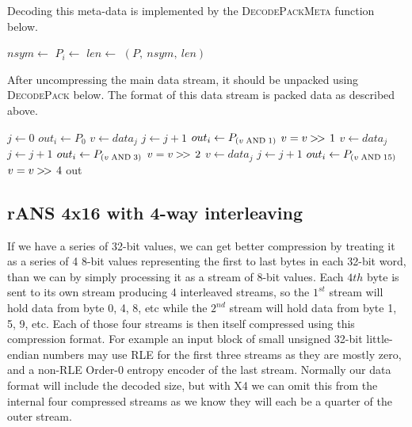 \documentclass[a4paper]{article}
\begin{document}
Decoding this meta-data is implemented by the \textsc{DecodePackMeta}
function below.

\begin{algorithmic}[1]
  \State $nsym \gets $
    \State $P_i \gets $ 
  \EndFor
  \State $len \gets $ 
  \State \Return $(P,\ nsym, \ len)$
\EndFunction
\end{algorithmic}

After uncompressing the main data stream, it should be unpacked using
\textsc{DecodePack} below.  The format of this data stream is packed
data as described above.

\begin{algorithmic}[1]
  \State $j \gets 0$ 
   
      \State $out_i \gets P_0$
    \EndFor
  \Statex
   
        \State $v \gets data_j$
        \State $j \gets j+1$
      \EndIf
      \State $out_i \gets P_{(v \bitand 1)}$
      \State $v = v \mathbin{>\mkern-3mu>\,} 1$
    \EndFor
  \Statex
   
        \State $v \gets data_j$
        \State $j \gets j+1$
      \EndIf
      \State $out_i \gets P_{(v \bitand 3)}$
      \State $v = v \mathbin{>\mkern-3mu>\,} 2$
    \EndFor
  \Statex
   
        \State $v \gets data_j$
        \State $j \gets j+1$
      \EndIf
      \State $out_i \gets P_{(v \bitand 15)}$
      \State $v = v \mathbin{>\mkern-3mu>\,} 4$
    \EndFor
  \Statex
  \Else
    \State {}
  \EndIf
  \Statex
  \State \Return out
\EndFunction
\end{algorithmic}


\subsection{rANS 4x16 with 4-way interleaving}
\label{sec:ransX4}

If we have a series of 32-bit values, we can get better compression by
treating it as a series of 4 8-bit values representing the first to
last bytes in each 32-bit word, than we can by simply processing it as
a stream of 8-bit values.
Each $4{th}$ byte is sent to its own stream producing 4 interleaved streams, so the $1^{st}$ stream will hold data from byte 0, 4, 8, etc while the $2^{nd}$ stream will hold data from byte 1, 5, 9, etc.
Each of those four streams is then itself compressed using this compression format.
For example an input block of small unsigned 32-bit little-endian numbers may use RLE for the first three streams as they are mostly zero, and a non-RLE Order-0 entropy encoder of the last stream.
Normally our data format will include the decoded size, but with X4 we can omit this from the internal four compressed streams as we know they will each be a quarter of the outer stream.
\end{document}
